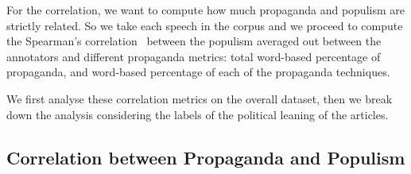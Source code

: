For the correlation, we want to compute how much propaganda and populism are strictly related. So we take each speech in the corpus and we proceed to compute the Spearman's correlation~\citep{spearman1910correlation} between the  populism averaged out between the annotators and different propaganda metrics: total word-based percentage of propaganda, and word-based percentage of each of the propaganda techniques.

We first analyse these correlation metrics on the overall dataset, then we break down the analysis considering the labels of the political leaning of the articles.


\subsection{Correlation between Propaganda and Populism}





